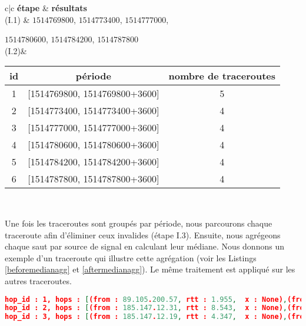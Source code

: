 
\begin{table}[H]
	\centering
	\begin{tabular}{c|c}
	\textbf{étape} &  \textbf{résultats}	\\ \hline
	(I.1) &   $ 1514769800 $, $ 1514773400 $, $ 1514777000 $,
	
	 $ 1514780600 $, $ 1514784200 $, $ 1514787800 $\\ \hline
(I.2)& 
				\begin{tabular}{ccc}
	\textbf{id}&	\textbf{période}&\textbf{nombre de traceroutes} \\ \hline
	1&	[1514769800, 1514769800+3600] & 5\\ \hline
	2&	[1514773400, 1514773400+3600] & 4\\ \hline
	3&	[1514777000, 1514777000+3600] & 4\\ \hline
	4&	[1514780600, 1514780600+3600] &4 \\ \hline
	5&	[1514784200, 1514784200+3600] &4 \\ \hline
	6&	[1514787800, 1514787800+3600] & 4 \\ \hline
				\end{tabular}\\ \hline
\end{tabular}
\end{table}

Une fois les traceroutes sont groupés par période, nous parcourons chaque traceroute afin d'éliminer ceux invalides (étape  I.3). 
Ensuite, nous agrégeons chaque saut par source de signal en calculant leur médiane. Nous donnons un exemple d'un traceroute qui illustre cette agrégation (voir les Listings \ref{beforemedianagg} et \ref{aftermedianagg}). Le même traitement est appliqué sur les autres traceroutes. 

\begin{lstlisting}[language=json,firstnumber=1, caption={Les sauts du traceroute T7 (sans agrégation)}, basicstyle=\footnotesize, label=beforemedianagg]
hop_id : 1, hops : [(from : 89.105.200.57, rtt : 1.955,  x : None),(from : 89.105.200.57, rtt : 1.7, x : None),(from : 89.105.200.57, rtt : 1.709,  x : None)]
hop_id : 2, hops : [(from : 185.147.12.31, rtt : 8.543,  x : None),(from : 185.147.12.31, rtt : 4.103, x : None),(from : 185.147.12.31, rtt : 4.41, x : None)]
hop_id : 3, hops : [(from : 185.147.12.19, rtt : 4.347,  x : None),(from : 185.147.12.19, rtt : 2.876, x : None),(from : 185.147.12.19, rtt : 3.143, x : None )]
\end{lstlisting}


